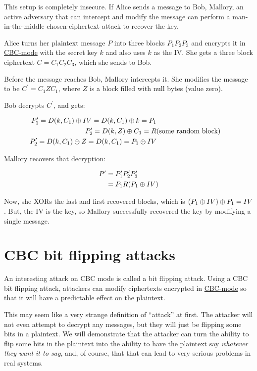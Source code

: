\documentclass[11pt,ebook,table,dvipsnames]{memoir}
\begin{document}
This setup is completely insecure. If Alice sends a message to Bob,
Mallory, an active adversary that can intercept and modify the message
can perform a man-in-the-middle chosen-ciphertext attack to recover
the key.

Alice turns her plaintext message $P$ into three blocks $P_1 P_2 P_3$
and encrypts it in \hyperref[CBC mode]{CBC-mode} with the secret key $k$ and also uses $k$
as the IV. She gets a three block ciphertext $C = C_1 C_2 C_3$, which
she sends to Bob.

Before the message reaches Bob, Mallory intercepts it. She modifies
the message to be $C^{\prime} = C_1 Z C_1$, where $Z$ is a block
filled with null bytes (value zero).

Bob decrypts $C^{\prime}$, and gets:

\begin{align*}
P^{\prime}_1 = D(k, C_1) \oplus IV = D(k, C_1) \oplus k = P_1 \\
P^{\prime}_2 = D(k, Z) \oplus C_1 = R & \text{(some random block)} \\
P^{\prime}_2 = D(k, C_1) \oplus Z = D(k, C_1) = P_1 \oplus IV
\end{align*}

Mallory recovers that decryption:

\begin{align*}
P^{\prime} & = P^{\prime}_1 P^{\prime}_2 P^{\prime}_3 \\
           & = P_1 R (P_1 \oplus IV)
\end{align*}

Now, she XORs the last and first recovered blocks, which is $(P_1 \oplus
IV) \oplus P_1 = IV$. But, the IV is the key, so Mallory successfully
recovered the key by modifying a single message.
\section{\label{CBC-bit-flipping-attacks}CBC bit flipping attacks}
\label{sec-2-3-7}

An interesting attack on \gls{CBC mode} is called a bit flipping
attack. Using a CBC bit flipping attack, attackers can modify
ciphertexts encrypted in \hyperref[CBC mode]{CBC-mode} so that it will have a predictable
effect on the plaintext.

This may seem like a very strange definition of \enquote{attack} at first. The
attacker will not even attempt to decrypt any messages, but they will
just be flipping some bits in a plaintext. We will demonstrate that
the attacker can turn the ability to flip some bits in the plaintext
into the ability to have the plaintext say \emph{whatever they want it to
say}, and, of course, that that can lead to very serious problems in
real systems.
\end{document}

